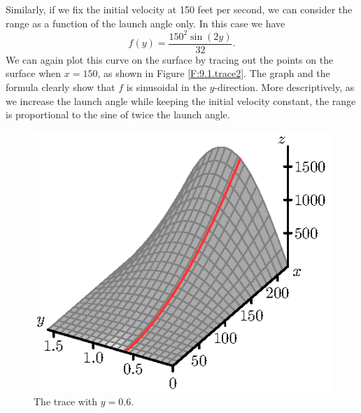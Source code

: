 Similarly, if we fix the initial velocity at 150 feet per second, we
can consider the range as a function of the launch angle only. In this
case we have
\[f(y) = \frac{150^2 \sin(2y)}{32}.\] 
We can again plot this curve on
the surface by tracing out the points on the surface when $x=150$, as
shown in Figure \ref{F:9.1.trace2}. The graph and the formula clearly
show that $f$ is sinusoidal in the $y$-direction. More descriptively,
as we increase the launch angle while keeping the initial velocity
constant, the range is proportional to the sine of twice the launch
angle.
\begin{figure}[ht]
\begin{center}
\begin{minipage}{2.5in}
\begin{center}
  \includegraphics{figures/fig_9_1_y_range.eps}
\caption{The trace with $y = 0.6$.}
\label{F:9.1.trace1}
\end{center}
\end{minipage}
\hspace{0.5in}
\begin{minipage}{2.5in}
\begin{center}

\end{center}
\end{minipage}
\end{center}
\end{figure}
